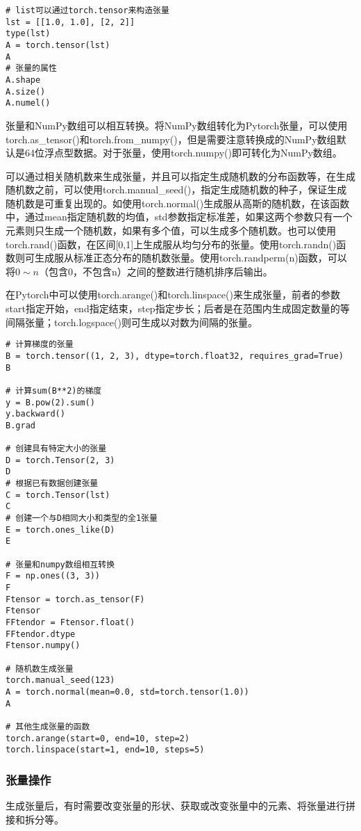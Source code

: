\documentclass[cn,hazy,blue,14pt,screen]{elegantnote}
\begin{document}
\begin{lstlisting}
# list可以通过torch.tensor来构造张量
lst = [[1.0, 1.0], [2, 2]]
type(lst)
A = torch.tensor(lst)
A
# 张量的属性
A.shape
A.size()
A.numel()
\end{lstlisting}
张量和NumPy数组可以相互转换。将NumPy数组转化为Pytorch张量，可以使用torch.as\_tensor()和torch.from\_numpy()，但是需要注意转换成的NumPy数组默认是64位浮点型数据。对于张量，使用torch.numpy()即可转化为NumPy数组。

可以通过相关随机数来生成张量，并且可以指定生成随机数的分布函数等，在生成随机数之前，可以使用torch.manual\_seed()，指定生成随机数的种子，保证生成随机数是可重复出现的。如使用torch.normal()生成服从高斯的随机数，在该函数中，通过mean指定随机数的均值，std参数指定标准差，如果这两个参数只有一个元素则只生成一个随机数，如果有多个值，可以生成多个随机数。也可以使用torch.rand()函数，在区间[0,1]上生成服从均匀分布的张量。使用torch.randn()函数则可生成服从标准正态分布的随机数张量。使用torch.randperm(n)函数，可以将$0\sim n$（包含0，不包含n）之间的整数进行随机排序后输出。

在Pytorch中可以使用torch.arange()和torch.linspace()来生成张量，前者的参数start指定开始，end指定结束，step指定步长；后者是在范围内生成固定数量的等间隔张量；torch.logspace()则可生成以对数为间隔的张量。
\begin{lstlisting}
# 计算梯度的张量
B = torch.tensor((1, 2, 3), dtype=torch.float32, requires_grad=True)
B

# 计算sum(B**2)的梯度
y = B.pow(2).sum()
y.backward()
B.grad

# 创建具有特定大小的张量
D = torch.Tensor(2, 3)
D
# 根据已有数据创建张量
C = torch.Tensor(lst)
C
# 创建一个与D相同大小和类型的全1张量
E = torch.ones_like(D)
E

# 张量和numpy数组相互转换
F = np.ones((3, 3))
F
Ftensor = torch.as_tensor(F)
Ftensor
FFtendor = Ftensor.float()
FFtendor.dtype
Ftensor.numpy()

# 随机数生成张量
torch.manual_seed(123)
A = torch.normal(mean=0.0, std=torch.tensor(1.0))
A

# 其他生成张量的函数
torch.arange(start=0, end=10, step=2)
torch.linspace(start=1, end=10, steps=5)
\end{lstlisting}
\subsubsection{张量操作}

生成张量后，有时需要改变张量的形状、获取或改变张量中的元素、将张量进行拼接和拆分等。
\end{document}
